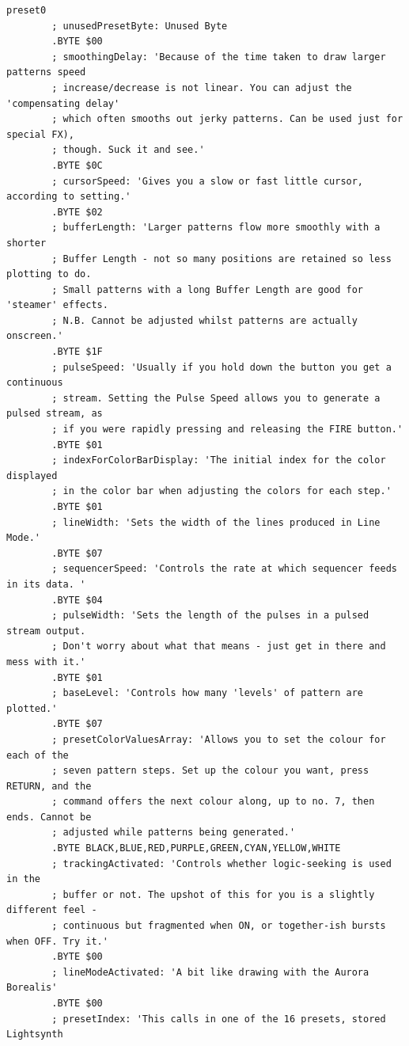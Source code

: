\begin{lstlisting}[basicstyle=\ttfamily\tiny,caption=Source code for Preset 0.]
preset0
        ; unusedPresetByte: Unused Byte
        .BYTE $00
        ; smoothingDelay: 'Because of the time taken to draw larger patterns speed
        ; increase/decrease is not linear. You can adjust the 'compensating delay'
        ; which often smooths out jerky patterns. Can be used just for special FX),
        ; though. Suck it and see.'
        .BYTE $0C
        ; cursorSpeed: 'Gives you a slow or fast little cursor, according to setting.'
        .BYTE $02
        ; bufferLength: 'Larger patterns flow more smoothly with a shorter
        ; Buffer Length - not so many positions are retained so less plotting to do.
        ; Small patterns with a long Buffer Length are good for 'steamer' effects.
        ; N.B. Cannot be adjusted whilst patterns are actually onscreen.'
        .BYTE $1F
        ; pulseSpeed: 'Usually if you hold down the button you get a continuous
        ; stream. Setting the Pulse Speed allows you to generate a pulsed stream, as
        ; if you were rapidly pressing and releasing the FIRE button.'
        .BYTE $01
        ; indexForColorBarDisplay: 'The initial index for the color displayed
        ; in the color bar when adjusting the colors for each step.'
        .BYTE $01
        ; lineWidth: 'Sets the width of the lines produced in Line Mode.'
        .BYTE $07
        ; sequencerSpeed: 'Controls the rate at which sequencer feeds in its data. '
        .BYTE $04
        ; pulseWidth: 'Sets the length of the pulses in a pulsed stream output.
        ; Don't worry about what that means - just get in there and mess with it.'
        .BYTE $01
        ; baseLevel: 'Controls how many 'levels' of pattern are plotted.'
        .BYTE $07
        ; presetColorValuesArray: 'Allows you to set the colour for each of the
        ; seven pattern steps. Set up the colour you want, press RETURN, and the
        ; command offers the next colour along, up to no. 7, then ends. Cannot be
        ; adjusted while patterns being generated.'
        .BYTE BLACK,BLUE,RED,PURPLE,GREEN,CYAN,YELLOW,WHITE
        ; trackingActivated: 'Controls whether logic-seeking is used in the
        ; buffer or not. The upshot of this for you is a slightly different feel -
        ; continuous but fragmented when ON, or together-ish bursts when OFF. Try it.'
        .BYTE $00
        ; lineModeActivated: 'A bit like drawing with the Aurora Borealis'
        .BYTE $00
        ; presetIndex: 'This calls in one of the 16 presets, stored Lightsynth

\end{lstlisting}
